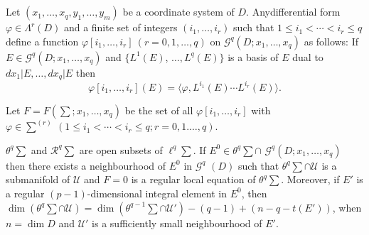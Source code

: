 \section{}\label{chap2:sec2.4} %

Let $(x_1,  \ldots ,  x_q,  y_1 ,  \ldots ,  y_m)$ be a coordinate
system of $D$. Any\pageoriginale differential form $\varphi \in \Lambda^r (D)$ and a
finite set of integers $(i_1,  \ldots ,  i_r)$ such that $1 \leq i_1 <
\cdots < i_r \leq  q$ define a function  $\varphi [ i_1 ,  \ldots ,
  i_r ] ~ (r= 0,  1,  \ldots ,  q)$ on $\mathscr{G}^q (D; x_1,  \ldots
,  x_q)$ as follows: If $E \in \mathscr{G}^q (D; x_1,  \ldots ,  x_q)$
and $\{L^1 (E)$,  $\ldots ,  L^q (E)\}$ is a basis of $E$ dual to $dx_1
\big | E,  \ldots ,  dx_q \big | E$ then  
$$
\varphi [i_1 ,  \ldots ,  i_r ](E) = \langle \varphi ,  L^{i_1} (E)
\cdots L^{i_r} (E) \rangle. 
$$

Let $F = F (\sum ; x_1 ,  \ldots ,  x_q)$ be the set of all $\varphi
[i_1 ,  \ldots,  i_r]$ with $\varphi \in \sum^{(r)} ~ (1 \le i_1 <
\cdots < i_r \leq q ; r = 0,  1 . \ldots ,  q)$. 

\begin{proposition}\label{chap2:sec2.4:prop7} %
  $\theta^q \sum$ and $\mathscr{R}^q \sum$ are open subsets of $\ell^q
  \sum$. If $E^0 \in \theta^q \sum \cap$ $\mathscr{G}^q (D; x_1,  \ldots
  ,  x_q)$ then there exists a neighbourhood of $E^0$ in
  $\mathscr{G}^q$ $(D)$ such that $\theta^q \sum \cap \mathscr{U}$ is a
  submanifold of $\mathscr{U}$ and  $F = 0$ is a regular local
  equation of $\theta^q \sum$. Moreover,  if $E'$ is a regular
  $(p-1)$-dimensional integral element in $E^0$,  then $\dim
  (\theta^q \sum \cap \mathscr{U}) = \dim (\theta^{q-1} \sum \cap
  \mathscr{U}' ) - (q-1) + (n-q-t (E'))$,  when $n = \dim D $ and
  $\mathscr{U}'$ is a sufficiently small neighbourhood of $E'$. 
\end{proposition}

